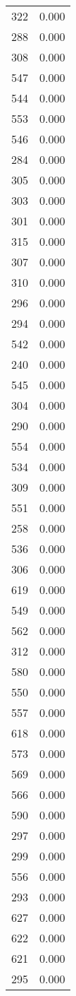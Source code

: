 \begin{table}
\begin{tabular}{lr}
322 & 0.000 \\
288 & 0.000 \\
308 & 0.000 \\
547 & 0.000 \\
544 & 0.000 \\
553 & 0.000 \\
546 & 0.000 \\
284 & 0.000 \\
305 & 0.000 \\
303 & 0.000 \\
301 & 0.000 \\
315 & 0.000 \\
307 & 0.000 \\
310 & 0.000 \\
296 & 0.000 \\
294 & 0.000 \\
542 & 0.000 \\
240 & 0.000 \\
545 & 0.000 \\
304 & 0.000 \\
290 & 0.000 \\
554 & 0.000 \\
534 & 0.000 \\
309 & 0.000 \\
551 & 0.000 \\
258 & 0.000 \\
536 & 0.000 \\
306 & 0.000 \\
619 & 0.000 \\
549 & 0.000 \\
562 & 0.000 \\
312 & 0.000 \\
580 & 0.000 \\
550 & 0.000 \\
557 & 0.000 \\
618 & 0.000 \\
573 & 0.000 \\
569 & 0.000 \\
566 & 0.000 \\
590 & 0.000 \\
297 & 0.000 \\
299 & 0.000 \\
556 & 0.000 \\
293 & 0.000 \\
627 & 0.000 \\
622 & 0.000 \\
621 & 0.000 \\
295 & 0.000 \\

\end{tabular}
\end{table}
